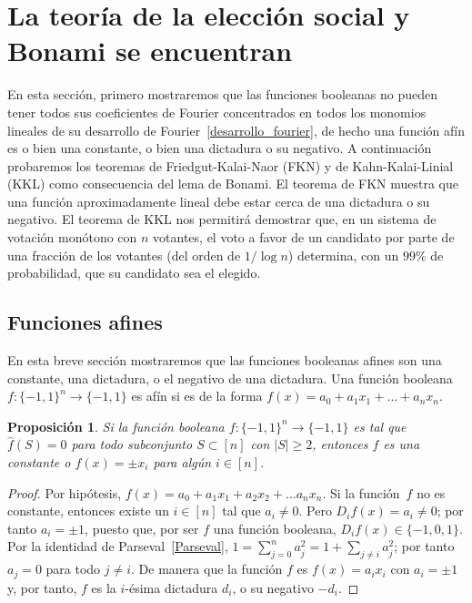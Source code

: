 \documentclass[autocontact]{gaceta}
\newtheorem{proposition}{Proposición}
\begin{document}
\section{La teoría de la elección social y Bonami se encuentran}
\label{sec:social-choice-meets-Bonami}

En esta sección, primero mostraremos que las funciones booleanas no pueden tener todos sus coeficientes de Fourier concentrados en todos los monomios lineales de su desarrollo de Fourier~\eqref{desarrollo_fourier}, de hecho una función afín es o bien una constante, o bien una dictadura o su negativo. A continuación probaremos los teoremas de Friedgut-Kalai-Naor (FKN) y de Kahn-Kalai-Linial (KKL) como consecuencia del lema de Bonami. El teorema de FKN muestra que una función aproximadamente lineal debe estar cerca de una dictadura o su negativo. El teorema de KKL nos permitirá demostrar que, en un sistema de votación monótono con $n$ votantes, el voto a favor de un candidato por parte de una fracción de los votantes (del orden de $1/\log n$) determina, con un $99\%$ de probabilidad, que su candidato sea el elegido.

\subsection{Funciones afines}\label{sec:singletons}

En esta breve sección mostraremos que las funciones booleanas afines son una constante, una dictadura, o el negativo de una dictadura. Una función booleana $f:\{-1,1\}^n\to\{-1,1\}$ es afín si es de la forma $f(x)=a_0+a_1 x_1+\dots+a_n x_n$.

\begin{proposition}\label{prop:boolean-functions-cant-concentrate-singletons}
Si la función booleana $f:\{-1,1\}^n\to \{-1,1\}$ es tal que $\widehat{f}(S)=0$ para todo subconjunto $S\subset [n]$ con $|S|\geq 2$, entonces $f$ es una constante o $f(x)=\pm x_i$ para algún $i\in [n]$.
\end{proposition}

\begin{proof}
Por hipótesis, $f(x)= a_0+a_1x_1+a_2x_2+\dots a_nx_n$. Si la función~$f$ no es constante, entonces existe un $i\in [n]$ tal que $a_i\neq 0$. Pero $D_if(x) = a_i\neq 0$; por tanto $a_i=\pm 1$, puesto que, por ser $f$ una función booleana, $D_if(x)\in \{-1,0,1\}$.
Por la identidad de Parseval~\eqref{Parseval}, $1=\sum_{j=0}^na_j^2=1 +\sum_{j\neq i} a_j^2$; por tanto $a_j=0$ para todo $j\neq i$. De manera que la función $f$ es
$f(x)=a_ix_i$ con $a_i=\pm 1$ y, por tanto, $f$ es la $i$-ésima dictadura $d_i$, o su negativo $-d_i$.
\end{proof}
\end{document}
